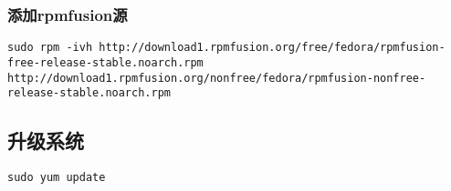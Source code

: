 \subsubsection{添加rpmfusion源}
\begin{lstlisting}
sudo rpm -ivh http://download1.rpmfusion.org/free/fedora/rpmfusion-free-release-stable.noarch.rpm 
http://download1.rpmfusion.org/nonfree/fedora/rpmfusion-nonfree-release-stable.noarch.rpm
\end{lstlisting}

\subsection{升级系统}
\begin{lstlisting}
sudo yum update
\end{lstlisting}




















